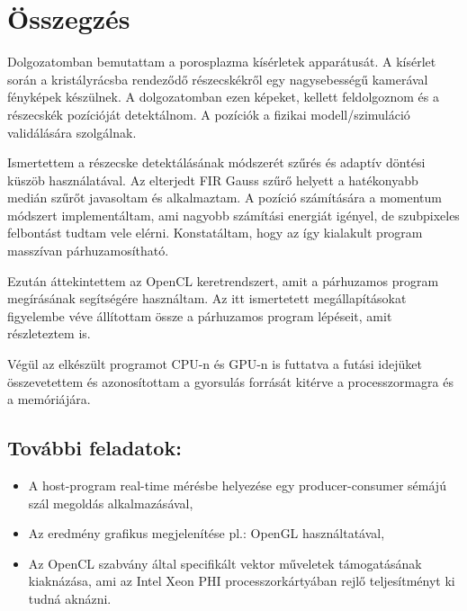 \chapter{Összegzés}

	Dolgozatomban bemutattam a porosplazma kísérletek apparátusát. A kísérlet során a kristályrácsba
	rendeződő részecskékről egy nagysebességű kamerával fényképek készülnek. A dolgozatomban ezen
	képeket, kellett feldolgoznom és a részecskék pozícióját detektálnom.
	A pozíciók a fizikai modell/szimuláció validálására szolgálnak.
	
	Ismertettem a részecske detektálásának módszerét szűrés és adaptív döntési küszöb használatával.
	Az elterjedt FIR Gauss szűrő helyett a hatékonyabb medián szűrőt javasoltam és alkalmaztam. A
	pozíció számítására a momentum módszert implementáltam, ami nagyobb számítási energiát igényel, de
	szubpixeles felbontást tudtam vele elérni. Konstatáltam, hogy az így kialakult program masszívan párhuzamosítható.
	
	Ezután áttekintettem az OpenCL keretrendszert, amit a párhuzamos program megírásának segítségére
	használtam. Az itt ismertetett megállapításokat figyelembe véve állítottam össze a párhuzamos
	program lépéseit, amit részleteztem is.
	
	Végül az elkészült programot CPU-n és GPU-n is futtatva a futási idejüket összevetettem és
	azonosítottam a gyorsulás forrását kitérve a processzormagra és a memóriájára.
	
	\section*{További feladatok:}
	\begin{itemize}
		\item A host-program real-time mérésbe helyezése egy producer-consumer sémájú szál megoldás
		alkalmazásával,
		\item Az eredmény grafikus  megjelenítése pl.: OpenGL használtatával,
		\item Az OpenCL szabvány által specifikált vektor műveletek támogatásának kiaknázása, ami az Intel
		Xeon PHI processzorkártyában rejlő teljesítményt ki tudná aknázni.
	\end{itemize}
	
	